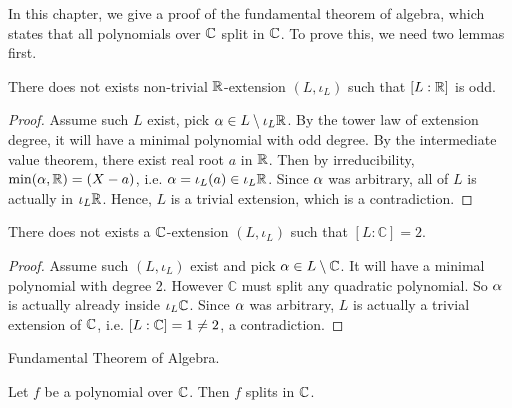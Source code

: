 \documentclass[../book.tex]{subfiles}
\begin{document}
In this chapter, we give a proof of the fundamental theorem of algebra,
which states that all polynomials over $\mathbb{C}$ split in $\mathbb{C}$. 
To prove this, we need two lemmas first.
\begin{lem}

    There does not exists non-trivial $\mathbb{R}$-extension $(L,\iota_L)$ 
    such that $[L : \mathbb{R}]$ is odd.
\end{lem}
\begin{proof}
    Assume such $L$ exist, pick $ \alpha \in L\setminus \iota_L\mathbb{R}$.
    By the tower law of extension degree, 
    it will have a minimal polynomial with odd degree. 
    By the intermediate value theorem, there exist real root $a$ in $\mathbb{R}$.
    Then by irreducibility, $\min(\alpha,\mathbb{R}) = (X - a)$, 
    i.e. $\alpha = \iota_L(a) \in \iota_L\mathbb{R}$.
    Since $\alpha$ was arbitrary, all of $L$ is actually in $\iota_L\mathbb{R}$.
    Hence, $L$ is a trivial extension, which is a contradiction. 
    
\end{proof}
\begin{lem}

    There does not exists a $\mathbb{C}$-extension $(L,\iota_L)$ 
    such that $[L : \mathbb{C}]=2$.
\end{lem}
\begin{proof}
    Assume such $(L,\iota_L)$ exist and 
    pick $ \alpha \in L \setminus \mathbb{C}$. 
    It will have a minimal polynomial with degree 2. 
    However $\mathbb{C}$ must split any quadratic polynomial.
    So $\alpha$ is actually already inside $\iota_L \mathbb{C}$.
    Since $\alpha$ was arbitrary, $L$ is actually a trivial extension of $\mathbb{C}$,
    i.e. $[L : \mathbb{C}] = 1 \neq 2$, a contradiction. 
\end{proof}
\begin{thm} Fundamental Theorem of Algebra. 
    
    Let $f$ be a polynomial over $\mathbb{C}$.
    Then $f$ splits in $\mathbb{C}$.
    
\end{thm}
\end{document}
